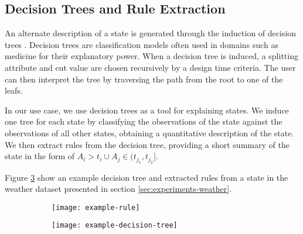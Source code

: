 \iffalse
In order to assist the user in identifying the meaning of states, the system provides automatic default
state names, based on the distribution of attributes in the state. Each state is given a default name
by combining its most outstanding attribute with a discrete level: LOWEST, LOW, HIGH or
HIGHEST.

The attribute and the level are chosen by comparing its distribution inside the state to the global
distribution in all the states through histograms. This is achieved by first computing the percentiles
of the global distribution. The $40^{th}$ percentile is then computed for the state distribution and
compared against the global distribution. If this percentile lies below the $25^{th}$ or $12^{th}$
percentile, the state is marked with LOW or LOWEST respectively. The final name is chosen according
to the attribute which lies in the lowest percentile.
\fi

\subsection{Decision Trees and Rule Extraction}

An alternate description of a state is generated through the induction of decision trees \cite{Witten:2005:DMP:1205860}. Decision
trees are classification models often used in domains such as medicine for their explanatory power.
When a decision tree is induced, a splitting attribute and cut value are chosen recursively by a
design time criteria. The user can then interpret the tree by traversing the path from the root 
to one of the leafs.

In our use case, we use decision trees as a tool for explaining states. We induce one tree for each
state by classifying the observations of the state against the observations of all other states,
obtaining a quantitative description of the state. We then extract rules from the decision tree,
providing a short summary of the state in the form of $A_i > t_i \cup A_j \in (t_{j_1}, t_{j_2}]$.

Figure \ref{fig:example-decision-tree-and-rule} show an example decision tree and extracted rules
from a state in the weather dataset presented in section \ref{sec:experiments-weather}.

\begin{figure}[h!]
	\centering
	\begin{subfigure}{.3\columnwidth}
	  	\centering
	  	\texttt{[image: example-rule]}
  		\caption{}
  		\label{fig:example-rule}
	\end{subfigure}
	\begin{subfigure}{.68\columnwidth}
	  	\centering
	  	\texttt{[image: example-decision-tree]}
	  	\caption{}
	  	\label{fig:example-decision-tree}
	\end{subfigure}
	\label{fig:example-decision-tree-and-rule}
\end{figure}

